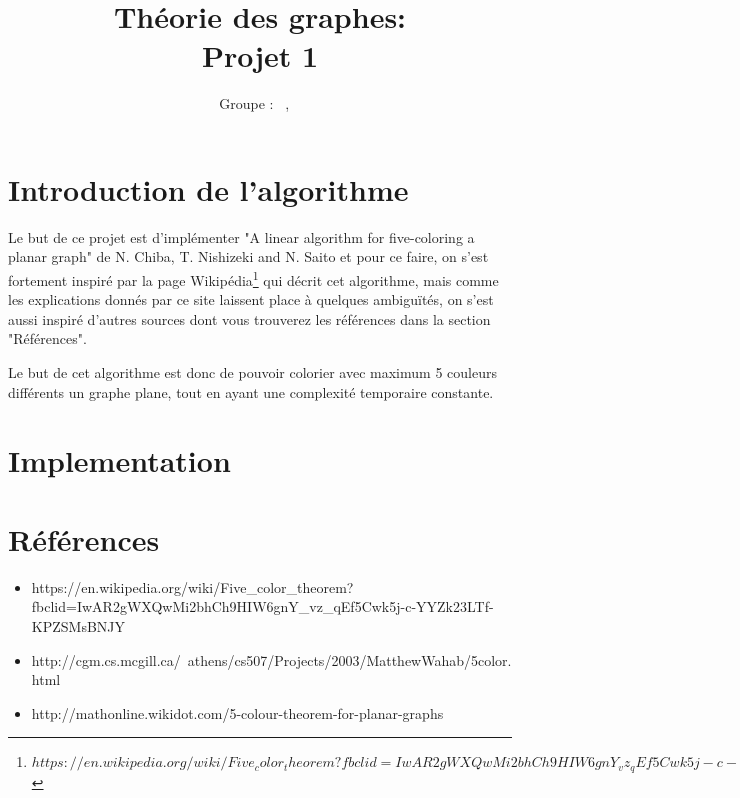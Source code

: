 \documentclass[a4paper, 11pt, oneside]{article}
\title{Théorie des graphes: \\ Projet 1\intitule}
\author{Groupe \GrNbr : \PrenomUN~\textsc{\NomUN}, \PrenomDEUX~\textsc{\NomDEUX}}
\date{}
\begin{document}
	\maketitle
	
	\newpage
	
	\section{Introduction de l'algorithme}
	Le but de ce projet est d'implémenter "A linear algorithm for five-coloring a planar graph" de N. Chiba, T. Nishizeki and N. Saito et pour ce faire, on s'est fortement inspiré par la page Wikipédia\footnote{$https://en.wikipedia.org/wiki/Five_color_theorem?fbclid=IwAR2gWXQwMi2bhCh9HIW6gnY_vz_qEf5Cwk5j-c-YYZk23LTf-KPZSMsBNJY$} qui décrit cet algorithme, mais comme les explications donnés par ce site laissent place à quelques ambiguïtés, on s'est aussi inspiré d'autres sources dont vous trouverez les références dans la section "Références".
	\par Le but de cet algorithme est donc de pouvoir colorier avec maximum 5 couleurs différents un graphe plane, tout en ayant une complexité temporaire constante.
	\section{Implementation}
	
	\newpage
	\section{Références}
	\begin{itemize}
		\item https://en.wikipedia.org/wiki/Five\_color\_theorem?fbclid=IwAR2gWXQwMi2bhCh9HIW6gnY\_vz\_qEf5Cwk5j-c-YYZk23LTf-KPZSMsBNJY
		\item http://cgm.cs.mcgill.ca/~athens/cs507/Projects/2003/MatthewWahab/5color.html
		\item http://mathonline.wikidot.com/5-colour-theorem-for-planar-graphs
	\end{itemize}
\end{document}
